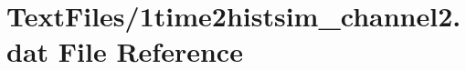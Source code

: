 \hypertarget{1time2histsim__channel2_8dat}{}\section{Text\+Files/1time2histsim\+\_\+channel2.dat File Reference}
\label{1time2histsim__channel2_8dat}
